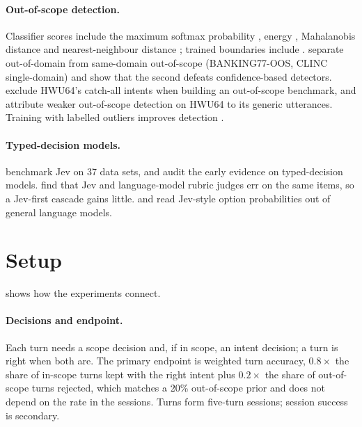 \documentclass[11pt]{article}
\begin{document}
\paragraph{Out-of-scope detection.} Classifier scores include the maximum softmax probability \citep{hendrycks2017baseline}, energy \citep{liu2020energy}, Mahalanobis distance \citep{lee2018mahalanobis,podolskiy2021mahalanobis} and nearest-neighbour distance \citep{sun2022knn}; trained boundaries include \citet{zhang2021adb}. \citet{zhang2022oos} separate out-of-domain from same-domain out-of-scope (BANKING77-OOS, CLINC single-domain) and show that the second defeats confidence-based detectors. \citet{li2024catchall} exclude HWU64's catch-all intents when building an out-of-scope benchmark, and \citet{yilmaz2022d2u} attribute weaker out-of-scope detection on HWU64 to its generic utterances. Training with labelled outliers improves detection \citep{hendrycks2019oe}.

\paragraph{Typed-decision models.} \citet{deusser2026jev} benchmark Jev on 37 data sets, and \citet{tang2026audit} audit the early evidence on typed-decision models. \citet{rao2026jev} find that Jev and language-model rubric judges err on the same items, so a Jev-first cascade gains little. \citet{anyjev2026} and \citet{li2026llmasjev} read Jev-style option probabilities out of general language models.

\section{Setup}
\label{sec:setup}



 shows how the experiments connect.

\paragraph{Decisions and endpoint.} Each turn needs a scope decision and, if in scope, an intent decision; a turn is right when both are. The primary endpoint is weighted turn accuracy, $0.8\times$ the share of in-scope turns kept with the right intent plus $0.2\times$ the share of out-of-scope turns rejected, which matches a 20\% out-of-scope prior and does not depend on the rate in the sessions. Turns form five-turn sessions; session success is secondary.
\end{document}
